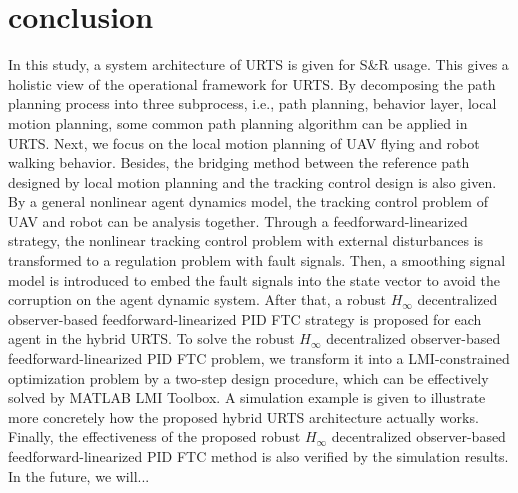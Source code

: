 \documentclass{ieeeaccess}
\begin{document}
\section{conclusion}
In this study, a system architecture of URTS is given for S\&R usage. This gives a holistic view of the operational framework for URTS. By decomposing the path planning process into three subprocess, i.e., path planning, behavior layer, local motion planning, some common path planning algorithm can be applied in URTS. Next, we focus on the local motion planning of UAV flying and robot walking behavior. Besides, the bridging method between the reference path designed by local motion planning and the tracking control design is also given. By a general nonlinear agent dynamics model, the tracking control problem of UAV and robot can be analysis together. Through a feedforward-linearized strategy, the nonlinear tracking control problem with external disturbances is transformed to a regulation problem with fault signals. Then, a smoothing signal model is introduced to embed the fault signals into the state vector to avoid the corruption on the agent dynamic system. After that, a robust $H_\infty$ decentralized observer-based feedforward-linearized PID FTC strategy is proposed for each agent in the hybrid URTS. To solve the robust $H_\infty$ decentralized observer-based feedforward-linearized PID FTC problem, we transform it into a LMI-constrained optimization problem by a two-step design procedure, which can be effectively solved by MATLAB LMI Toolbox. A simulation example is given to illustrate more concretely how the proposed hybrid URTS architecture actually works. Finally, the effectiveness of the proposed robust $H_\infty$ decentralized observer-based feedforward-linearized PID FTC method is also verified by the simulation results. In the future, we will...





\EOD
\end{document}
